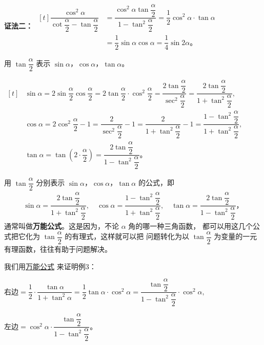 \textbf{证法二：} $\begin{aligned}[t]
    \dfrac{\cos^2\alpha}{\cot\dfrac{\alpha}{2} - \tan\dfrac{\alpha}{2}} &= \dfrac{\cos^2\alpha \tan\dfrac{\alpha}{2}}{1 - \tan^2\dfrac{\alpha}{2}} = \dfrac 1 2 \cos^2\alpha \cdot \tan\alpha \\
    &= \dfrac 1 2 \sin\alpha \cos\alpha = \dfrac 1 4 \sin2\alpha \text{。}
\end{aligned}$ \jiange

\liti 用 $\tan\dfrac{\alpha}{2}$ 表示 $\sin\alpha$，$\cos\alpha$，$\tan\alpha$。

\jie $\begin{aligned}[t]
    & \sin\alpha = 2\sin\dfrac{\alpha}{2} \cos\dfrac{\alpha}{2} = 2\tan\dfrac{\alpha}{2} \cdot \cos^2\dfrac{\alpha}{2}
        = \dfrac{2\tan\dfrac{\alpha}{2}}{\sec^2\dfrac{\alpha}{2}}
        = \dfrac{2\tan\dfrac{\alpha}{2}}{1 + \tan^2\dfrac{\alpha}{2}}, \\
    & \cos\alpha = 2\cos^2\dfrac{\alpha}{2} - 1
        = \dfrac{2}{\sec^2\dfrac{\alpha}{2}} - 1
        = \dfrac{2}{1 + \tan^2\dfrac{\alpha}{2}} - 1
        = \dfrac{1 - \tan^2\dfrac{\alpha}{2}}{1 + \tan^2\dfrac{\alpha}{2}} , \\
    & \tan\alpha = \tan\left(2 \cdot \dfrac{\alpha}{2}\right) = \dfrac{2\tan\dfrac{\alpha}{2}}{1 - \tan^2\dfrac{\alpha}{2}} \text{。}
\end{aligned}$

用 $\tan\dfrac{\alpha}{2}$ 分别表示 $\sin\alpha$，$\cos\alpha$，$\tan\alpha$ 的公式，即
\begin{gather*}
    \sin\alpha = \dfrac{2\tan\dfrac{\alpha}{2}}{1 + \tan^2\dfrac{\alpha}{2}} ,\quad
    \cos\alpha = \dfrac{1 - \tan^2\dfrac{\alpha}{2}}{1 + \tan^2\dfrac{\alpha}{2}} ,\quad
    \tan\alpha = \dfrac{2\tan\dfrac{\alpha}{2}}{1 - \tan^2\dfrac{\alpha}{2}} \text{，}
\end{gather*}
通常叫做\textbf{万能公式}。这是因为，不论 $\alpha$ 角的哪一种三角函数，
都可以用这几个公式把它化为 $\tan\dfrac{\alpha}{2}$ 的有理式，这样就可以把
问题转化为以 $\tan\dfrac{\alpha}{2}$ 为变量的一元有理函数，往往有助于问题解决。

我们用\hyperref[wannenggongshi]{万能公式} 来证明例3：

$
\text{右边} = \dfrac 1 2 \cdot \dfrac{\tan\alpha}{1 + \tan^2\alpha}
    = \dfrac 1 2 \tan\alpha \cdot \cos^2\alpha
    = \dfrac{\tan\dfrac{\alpha}{2}}{1 - \tan^2\dfrac{\alpha}{2}} \cdot \cos^2\alpha,
$ \jiange

$
\text{左边} = \cos^2\alpha \cdot \dfrac{\tan\dfrac{\alpha}{2}}{1 - \tan^2\dfrac{\alpha}{2}} \text{。}
$ \jiange


